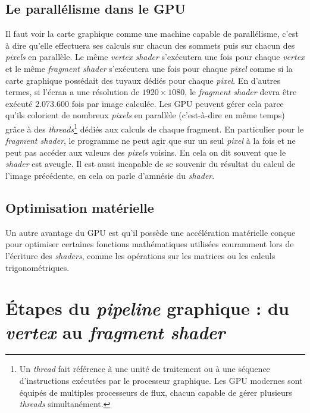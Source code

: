 \subsection*{Le parallélisme dans le GPU}   
Il faut voir la carte graphique comme une machine capable de parallélisme, c'est à dire qu'elle effectuera ses calculs sur chacun des sommets puis sur chacun des \textit{pixels} en parallèle. Le même \textit{vertex shader} s'exécutera une fois pour chaque \textit{vertex} et le même \textit{fragment shader} s'exécutera une fois pour chaque \textit{pixel} comme si la carte graphique possédait des tuyaux dédiés pour chaque \textit{pixel}. En d'autres termes, si l'écran a une résolution de $1920\times1080$, le \textit{fragment shader} devra être exécuté $2.073.600$ fois par image calculée. Les GPU peuvent gérer cela parce qu'ils colorient de nombreux \textit{pixels} en parallèle (c'est-à-dire en même temps) grâce à des \textit{threads}\footnote{Un \textit{thread} fait référence à une unité de traitement ou à une séquence d'instructions exécutées par le processeur graphique. Les GPU modernes sont équipés de multiples processeurs de flux, chacun capable de gérer plusieurs \textit{threads} simultanément.} dédiés aux calculs de chaque fragment. En particulier pour le \textit{fragment shader}, le programme ne peut agir que sur un seul \textit{pixel} à la fois et ne peut pas accéder aux valeurs des \textit{pixels} voisins. En cela on dit souvent que le \textit{shader} est aveugle. Il est aussi incapable de se souvenir du résultat du calcul de l'image précédente, en cela on parle d'amnésie du \textit{shader}.


\subsection*{Optimisation matérielle}
Un autre avantage du GPU est qu'il possède une accélération matérielle conçue pour optimiser certaines fonctions mathématiques utilisées couramment lors de l'écriture des \textit{shaders}, comme les opérations sur les matrices ou les calculs trigonométriques. 





\section{Étapes du \textit{pipeline} graphique : du \textit{vertex} au \textit{fragment shader}}

